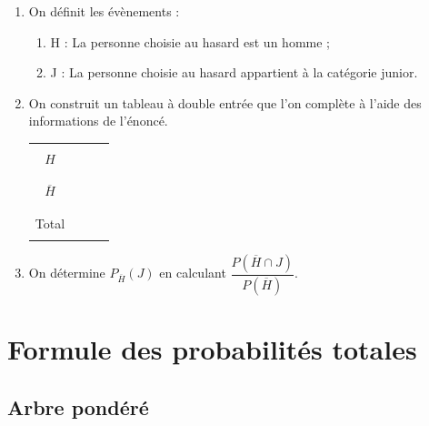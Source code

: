 \documentclass[a4paper,11pt,cours]{nsi} %
\begin{document}
\begin{methode}[ ]
	\begin{enumerate}
		\item 	On définit les évènements :
		\begin{enumerate}[label=\textbullet]
			\item 	H : La personne choisie au hasard est un homme ;
			\item 	J : La personne choisie au hasard appartient à la catégorie junior.
		\end{enumerate}
		\item 	On construit un tableau à double entrée que l'on complète à l'aide des informations de l'énoncé.
		\begin{center}
			\begin{tabular}{|c|p{4cm}|p{4cm}|p{4cm}|}
				\hline
				\rowcolor{UGLiOrange}  & \makebox[\linewidth][c]{$J$} & \makebox[\linewidth][c]{$\overline{J}$} & \makebox[\linewidth][c]{Total}\\
				\hline
				\cellcolor{UGLiOrange} & & & \\
				\cellcolor{UGLiOrange} $H$ & & & \\
				\cellcolor{UGLiOrange} & & & \\
				\hline
				\cellcolor{UGLiOrange} & & & \\
				\cellcolor{UGLiOrange} $\overline{H}$ & & & \\
				\cellcolor{UGLiOrange} & & & \\
				\hline
				\cellcolor{UGLiOrange} & & & \\
				\cellcolor{UGLiOrange} Total & & & \\
				\cellcolor{UGLiOrange} & & & \\
				\hline
			\end{tabular}
		\end{center}
		\item	On détermine $P_{\overline{H}}(J)$ en calculant $\dfrac{P(\overline{H}\cap J)}{P(\overline{H})}$.\\
	\end{enumerate}
\end{methode}

\section{Formule des probabilités totales}
\subsection{Arbre pondéré}
\end{document}
